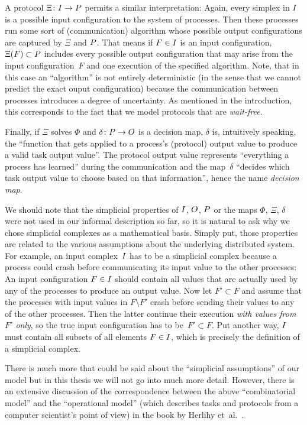 A protocol $\Xi\colon I\to P$ permits a similar interpretation:
Again, every simplex in $I$ is a possible input configuration to
the system of processes. Then these processes run some sort of
(communication) algorithm whose possible output configurations are
captured by $\Xi$ and $P$. That means if $F\in I$ is an input
configuration, $\Xi(F) \subset P$ includes every possible output
configuration that may arise from the input configuration~$F$ and
one execution of the specified algorithm. Note, that in this case
an \enquote{algorithm} is not entirely deterministic (in the sense
that we cannot predict the exact ouput configuration) because the
communication between processes introduces a degree of uncertainty.
As mentioned in the introduction, this corresponds to the fact that
we model protocols that are \emph{wait-free}.

Finally, if $\Xi$ solves $\Phi$ and $\delta\colon P\to O$ is a decision
map, $\delta$ is, intuitively speaking, the \enquote{function that
gets applied to a process's (protocol) output value to produce a valid
task output value}. The protocol output value represents
\enquote{everything a process has learned} during the communication
and the map~$\delta$ \enquote{decides which task output value to
choose based on that information}, hence the name \emph{decision map}.

We should note that the simplicial properties of $I$, $O$, $P$
or the maps $\Phi$, $\Xi$, $\delta$ were not used in our informal
description so far, so it is natural to ask why we chose simplicial
complexes as a mathematical basis. Simply put, those properties are
related to the various assumptions about the underlying distributed
system. For example, an input complex~$I$ has to be a simplicial 
complex because a process could crash before communicating its input
value to the other processes: An input configuration $F\in I$
should contain all values that are actually used by any of
the processes to produce an output value. Now let $F'\subset F$ and
assume that the processes with input values in $F\setminus F'$ crash
before sending their values to any of the other processes. Then the
latter continue their execution \emph{with values from~$F'$ only}, so
the true input configuration has to be~$F'\subset F$. Put another way,
$I$ must contain all subsets of all elements $F\in I$, which is
precisely the definition of a simplicial complex.

There is much more that could be said about the \enquote{simplicial
assumptions} of our model but in this thesis we will not go into much more
detail. However, there is an extensive discussion of the
correspondence between the above \enquote{combinatorial model} and the
\enquote{operational model} (which describes tasks and protocols from
a computer scientist's point of view) in the book by
Herlihy et~al.~\cite[Ch.\,4]{bookc:herlihyetal13}.

